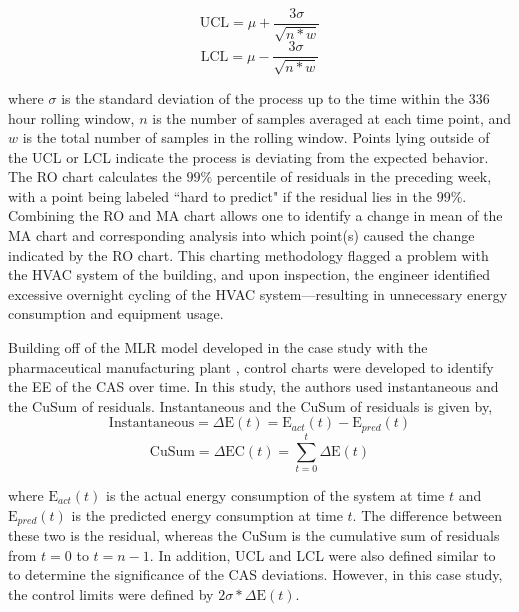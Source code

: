 \begin{equation}
    \text{UCL} = \mu + \frac{3\sigma}{\sqrt{n * w}}
\end{equation}
\begin{equation}
    \text{LCL} = \mu - \frac{3\sigma}{\sqrt{n * w}}
\end{equation}


where $\sigma$ is the standard deviation of the process up to the time within the $336$ hour rolling window, $n$ is the number of samples averaged at each time point, and $w$ is the total number of samples in the rolling window. Points lying outside of the UCL or LCL indicate the process is deviating from the expected behavior. The RO chart calculates the $99\%$ percentile of residuals in the preceding week, with a point being labeled ``hard to predict" if the residual lies in the $99\%$. Combining the RO and MA chart allows one to identify a change in mean of the MA chart and corresponding analysis into which point(s) caused the change indicated by the RO chart. This charting methodology flagged a problem with the HVAC system of the building, and upon inspection, the engineer identified excessive overnight cycling of the HVAC system—resulting in unnecessary energy consumption and equipment usage. 

Building off of the MLR model developed in the case study with the pharmaceutical manufacturing plant \cite{cas}, control charts were developed to identify the EE of the CAS over time. In this study, the authors used instantaneous and the \ac{CuSum} of residuals. Instantaneous and the CuSum of residuals is given by,
\begin{equation}
    \text{Instantaneous} = \Delta \text{E}(t) = \text{E}_{act}(t) - \text{E}_{pred}(t)
\end{equation}
\begin{equation}
    \text{CuSum} = \Delta \text{EC}(t) = \sum_{t=0}^t\Delta \text{E}(t)
\end{equation}

where $\text{E}_{act}(t)$ is the actual energy consumption of the system at time $t$ and $\text{E}_{pred}(t)$ is the predicted energy consumption at time $t$. The difference between these two is the residual, whereas the CuSum is the cumulative sum of residuals from $t=0$ to $t=n-1$. In addition, UCL and LCL were also defined similar to \cite{tightening} to determine the significance of the CAS deviations. However, in this case study, the control limits were defined by $2 \sigma * \Delta \text{E}(t)$. 


